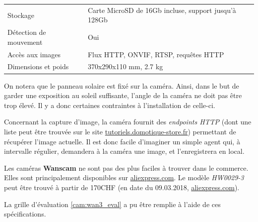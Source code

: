 \begin{table}[H]
\begin{tabular}{@{}ll@{}}
    Stockage               & Carte MicroSD de 16Gb incluse, support jusqu'à 128Gb                                                                                                                                                                                                                                        \\ [0.8ex]
    Détection de mouvement & Oui                                                                                                                                                                                                                                                                                         \\ [0.8ex]
    Accès aux images       & Flux HTTP, ONVIF, RTSP, requêtes HTTP                                                                                                                                                                                                                                                       \\ [0.8ex]
    Dimensions et poids    & 370x290x110 mm, 2.7 kg                                                                                                                                                                                                                                                                      \\ \bottomrule
    \end{tabular}
\end{table}

On notera que le panneau solaire est fixé sur la caméra. Ainsi, dans le but de garder une exposition au soleil suffisante, l'angle de la caméra ne doit pas être trop élevé. Il y a donc certaines contraintes à l'installation de celle-ci.

Concernant la capture d'image, la caméra fournit des \textit{endpoints HTTP} (dont une liste peut être trouvée sur le site \url{tutoriels.domotique-store.fr}\autocite{cam:wan3-url}) permettant de récupérer l'image actuelle. Il est donc facile d'imaginer un simple agent qui, à intervalle régulier, demandera à la caméra une image, et l'enregistrera en local.

Les caméras \textbf{Wanscam} ne sont pas des plus faciles à trouver dans le commerce. Elles sont principalement disponibles sur \url{aliexpress.com}. Le modèle \textit{HW0029-3} peut être trouvé à partir de 170CHF (en date du 09.03.2018, \url{aliexpress.com}).

La grille d'évaluation \ref{cam:wan3_eval} a pu être remplie à l'aide de ces spécifications.

